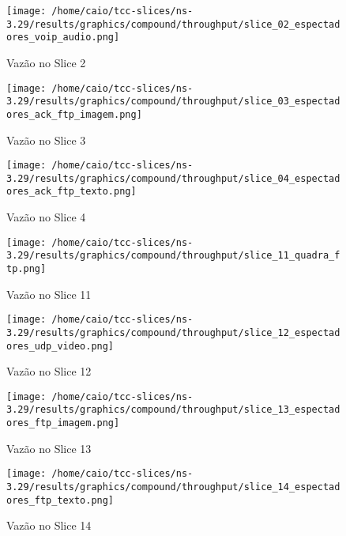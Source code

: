 \documentclass[11pt,twoside]{article}
\begin{document}
	\begin{figure}[H]
		\centering
		\texttt{[image: /home/caio/tcc-slices/ns-3.29/results/graphics/compound/throughput/slice\_02\_espectadores\_voip\_audio.png]}
		\caption{Vazão no Slice 2}
		\label{throughput2}
	\end{figure}
	
	\begin{figure}[H]
		\centering
		\texttt{[image: /home/caio/tcc-slices/ns-3.29/results/graphics/compound/throughput/slice\_03\_espectadores\_ack\_ftp\_imagem.png]}
		\caption{Vazão no Slice 3}
		\label{throughput3}
	\end{figure}
	
	\begin{figure}[H]
		\centering
		\texttt{[image: /home/caio/tcc-slices/ns-3.29/results/graphics/compound/throughput/slice\_04\_espectadores\_ack\_ftp\_texto.png]}
		\caption{Vazão no Slice 4}
		\label{throughput4}
	\end{figure}
	
	\begin{figure}[H]
		\centering
		\texttt{[image: /home/caio/tcc-slices/ns-3.29/results/graphics/compound/throughput/slice\_11\_quadra\_ftp.png]}
		\caption{Vazão no Slice 11}
		\label{throughput11}
	\end{figure}
	
	\begin{figure}[H]
		\centering
		\texttt{[image: /home/caio/tcc-slices/ns-3.29/results/graphics/compound/throughput/slice\_12\_espectadores\_udp\_video.png]}
		\caption{Vazão no Slice 12}
		\label{throughput12}
	\end{figure}
	
	\begin{figure}[H]
		\centering
		\texttt{[image: /home/caio/tcc-slices/ns-3.29/results/graphics/compound/throughput/slice\_13\_espectadores\_ftp\_imagem.png]}
		\caption{Vazão no Slice 13}
		\label{throughput13}
	\end{figure}
	
	\begin{figure}[H]
		\centering
		\texttt{[image: /home/caio/tcc-slices/ns-3.29/results/graphics/compound/throughput/slice\_14\_espectadores\_ftp\_texto.png]}
		\caption{Vazão no Slice 14}
		\label{throughput14}
	\end{figure}
\end{document}
